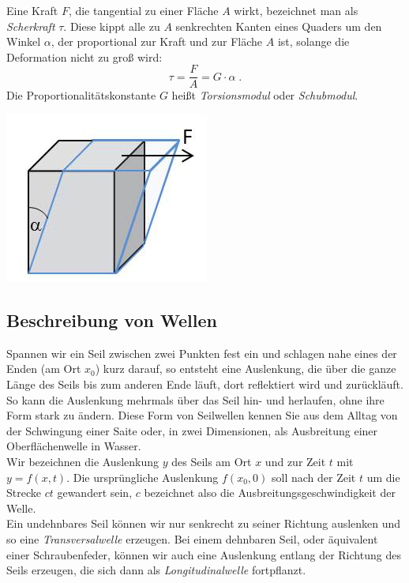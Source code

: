 \begin{minipage}[b]{0.64\textwidth}
Eine Kraft $F$, die tangential zu einer Fläche $A$ wirkt, bezeichnet man als \textit{Scherkraft} $\tau$. Diese kippt alle zu $A$ senkrechten Kanten eines Quaders um den Winkel $\alpha$, der proportional zur Kraft und zur Fläche $A$ ist, solange die Deformation nicht zu groß wird:
\begin{equation}
	\tau = \frac{F}{A} = G\cdot \alpha\; .
\end{equation}
Die Proportionalitätskonstante $G$ heißt \textit{Torsionsmodul} oder \textit{Schubmodul}.
\end{minipage}
\hfill
\begin{minipage}[b]{0.30\textwidth}
	\includegraphics[width=.8\textwidth]{Abbildungen/Scherung.jpg}
	\label{fig:Scherung}
\end{minipage}


\subsection{Beschreibung von Wellen}

Spannen wir ein Seil zwischen zwei Punkten fest ein und schlagen nahe eines der Enden (am Ort $x_0$) kurz darauf, so entsteht eine Auslenkung, die über die ganze Länge des Seils bis zum anderen Ende läuft, dort reflektiert wird und zurückläuft. So kann die Auslenkung mehrmals über das Seil hin- und herlaufen, ohne ihre Form stark zu ändern. Diese Form von Seilwellen kennen Sie aus dem Alltag von der Schwingung einer Saite oder, in zwei Dimensionen, als Ausbreitung einer Oberflächenwelle in Wasser.\\
Wir bezeichnen die Auslenkung $y$ des Seils am Ort $x$ und zur Zeit $t$ mit $y=f(x,t)$. Die ursprüngliche Auslenkung $f(x_0, 0)$ soll nach der Zeit $t$ um die Strecke $ct$ gewandert sein, $c$ bezeichnet also die Ausbreitungsgeschwindigkeit der Welle.\\
Ein undehnbares Seil können wir nur senkrecht zu seiner Richtung auslenken und so eine \textit{Transversalwelle} erzeugen. Bei einem dehnbaren Seil, oder äquivalent einer Schraubenfeder, können wir auch eine Auslenkung entlang der Richtung des Seils erzeugen, die sich dann als \textit{Longitudinalwelle} fortpflanzt.\\

